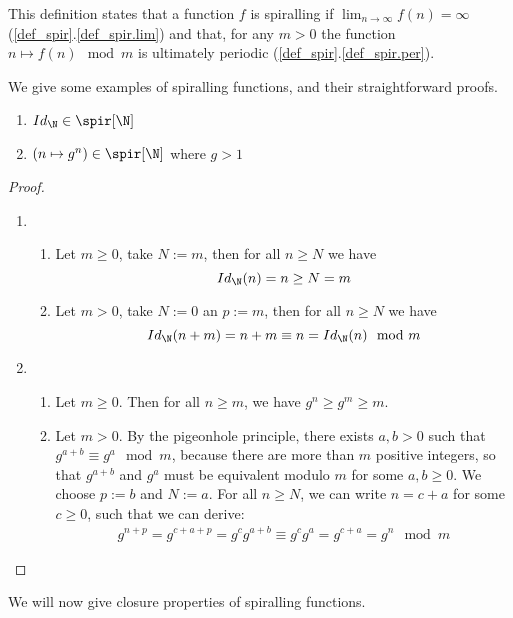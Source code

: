 This definition states that a function $f$ is spiralling if $\lim_{n\to\infty}f(n)=\infty$ (\ref{def_spir}.\ref{def_spir.lim}) and that, for any $m>0$ the function $n \mapsto f(n) \mod m$ is ultimately periodic (\ref{def_spir}.\ref{def_spir.per}).

We give some examples of spiralling functions, and their straightforward proofs.

\begin{proposition}\hfill\label{spir_func_1}
	\begin{enumerate}
		\item $Id_\N\in\spir[\N]$
		\item $(n \mapsto g^n)\in\spir[\N]$ where $g>1$ 
	\end{enumerate}
\begin{proof}
	\hfill
	\begin{enumerate}
		\item 
		\begin{enumerate}
			\item Let $m\geq0$, take $N:=m$, then for all $n\geq N$ we have $$Id_\N(n)=n\geq N = m$$
			\item Let $m>0$, take $N := 0$ an $p := m$, then for all $n\geq N$ we have $$Id_\N(n + m) = n+m \equiv n = Id_\N(n) \mod m$$
		\end{enumerate}
		\item 
		\begin{enumerate}
			\item Let $m\geq 0$. Then for all $n\geq m$, we have $g^n \geq g^m \geq m$.
			\item Let $m>0$. By the pigeonhole principle, there exists $a,b>0$ such that $g^{a+b} \equiv g^{a} \mod m$, because there are more than $m$ positive integers, so that $g^{a+b}$ and $g^{a}$ must be equivalent modulo $m$ for some $a,b\geq0$. We choose $p := b$ and $N := a$. For all $n\geq N$, we can write $n = c + a$ for some $c \geq 0$, such that we can derive:
			\begin{align*}
				g^{n+p} = 
				g^{c+a+p} = 
				g^{c}g^{a+b} \equiv
				g^{c}g^{a} = 
				g^{c+a} =
				g^{n} \mod m
			\end{align*}
		\end{enumerate}
	\end{enumerate}
\end{proof}
\end{proposition}

We will now give closure properties of spiralling functions.


